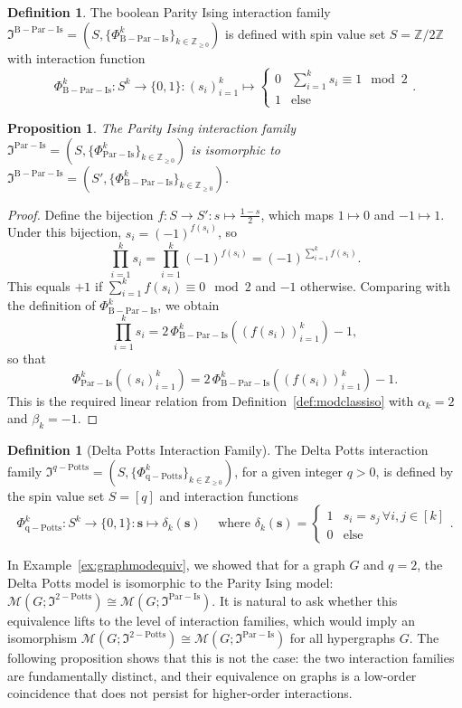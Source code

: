\documentclass[11pt,reqno]{amsart}
\newcommand{\vecs}{\boldsymbol{s}}
\newcommand{\Mo}{\mathcal{M}}
\newcommand{\mci}{\mathfrak{I}^{\mathrm{Par-Is}}}
\newcommand{\mcib}{\mathfrak{I}^{\mathrm{B-Par-Is}}}
\newcommand{\mcp}{\mathfrak{I}^{q-\mathrm{Potts}}}
\newcommand{\mcpt}{\mathfrak{I}^{2-\mathrm{Potts}}}
\newcommand{\sset}{spin value set }
\newcommand{\PhiIs}{\Phi_{\mathrm{Par-Is}}}
\newcommand{\PhibIs}{\Phi_{\mathrm{B-Par-Is}}}
\newcommand{\PhiPotts}{\Phi_{\mathrm{q-Potts}}}
\theoremstyle{plain}
\newtheorem{proposition}[theorem]{Proposition}
\theoremstyle{definition}
\newtheorem{definition}[theorem]{Definition}
\numberwithin{equation}{section}
\begin{document}
\begin{definition}
    The boolean Parity Ising interaction family $\mcib = (S, \{\PhibIs^k \}_{k \in \mathbb{Z}_{\geq 0}})$ is defined with \sset $S = \mathbb{Z}/2\mathbb{Z}$ with interaction function
    \[ \PhibIs^k \colon S^k \to \{0,1\} \colon (s_i)_{i=1}^k \mapsto \begin{cases}
        0 & \sum_{i=1}^k s_i \equiv 1 \mod 2 \\
        1 & \text{else}
    \end{cases}.\]
\end{definition}
\begin{proposition}
\label{prop:parisboiso}
    The Parity Ising interaction family $\mci = (S, \{\PhiIs^k\}_{k \in \mathbb{Z}_{\geq 0}})$ is isomorphic to $\mcib = (S', \{\PhibIs^k\}_{k \in \mathbb{Z}_{\geq 0}})$.
\end{proposition}
\begin{proof}
    Define the bijection $f \colon S \to S' \colon s \mapsto \frac{1-s}{2}$, which maps $1 \mapsto 0$ and $-1 \mapsto 1$. Under this bijection, $s_i = (-1)^{f(s_i)}$, so
    \[
    \prod_{i=1}^k s_i = \prod_{i=1}^k (-1)^{f(s_i)} = (-1)^{\sum_{i=1}^k f(s_i)}.
    \]
    This equals $+1$ if $\sum_{i=1}^k f(s_i) \equiv 0 \mod{2}$ and $-1$ otherwise. Comparing with the definition of $\PhibIs^k$, we obtain
    \[
    \prod_{i=1}^k s_i = 2\,\PhibIs^k((f(s_i))_{i=1}^k) - 1,
    \]
    so that
    \[
    \PhiIs^k((s_i)_{i=1}^k) = 2\,\PhibIs^k((f(s_i))_{i=1}^k) - 1.
    \]
    This is the required linear relation from Definition~\ref{def:modclassiso} with $\alpha_k = 2$ and $\beta_k = -1$.
\end{proof}

\begin{definition}[Delta Potts Interaction Family]
    \label{def:delpottsfam}
    The Delta Potts interaction family $\mcp = (S, \{\PhiPotts^k\}_{k \in \mathbb{Z}_{\geq 0}})$, for a given integer $q > 0$, is defined by the \sset $S =[q]$ and interaction functions
    \[
    \PhiPotts^k \colon S^k \to \{0,1\} \colon \vecs \mapsto \delta_k(\vecs) \quad \text { where } \delta_k(\vecs) =  \begin{cases}
        1 & s_i = s_j \, \forall i,j \in [k] \\
        0 & \text{else}
    \end{cases}.
    \]
\end{definition}

In Example~\ref{ex:graphmodequiv}, we showed that for a graph $G$ and $q=2$, the Delta Potts model is isomorphic to the Parity Ising model: $\Mo(G; \mcpt) \cong \Mo(G; \mci)$. It is natural to ask whether this equivalence lifts to the level of interaction families, which would imply an isomorphism $\Mo(G; \mcpt) \cong \Mo(G; \mci)$ for all hypergraphs $G$. The following proposition shows that this is not the case: the two interaction families are fundamentally distinct, and their equivalence on graphs is a low-order coincidence that does not persist for higher-order interactions.
\end{document}
